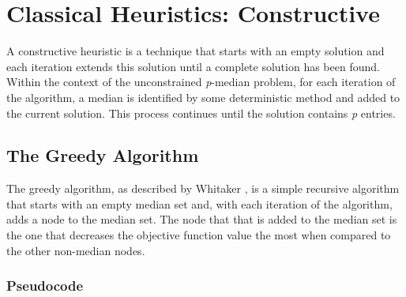 \documentclass[11pt]{article}
\begin{document}
	\section{Classical Heuristics: Constructive}
	A constructive heuristic is a technique that starts with an empty solution and each iteration extends this solution until a complete solution has been found.  Within the context of the unconstrained \emph{p}-median problem, for each iteration of the algorithm, a median is identified by some deterministic method and added to the current solution.  This process continues until the solution contains \emph{p} entries.
	
	\subsection{The Greedy Algorithm}
	The greedy algorithm,  as described by Whitaker \cite{WHIT83},  is a simple recursive algorithm that starts with an empty median set and, with each iteration of the algorithm, adds a node to the median set.  The node that that is added to the median set is the one that decreases the objective function value the most when compared to the other non-median nodes.
	
	\subsubsection{Pseudocode}
	
\end{document}
